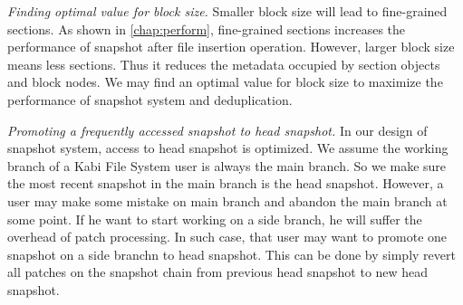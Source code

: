     \emph{Finding optimal value for block size.} Smaller block size will lead to fine-grained sections. As shown in \cref{chap:perform}, fine-grained sections increases the performance of snapshot after file insertion operation. However, larger block size means less sections. Thus it reduces the metadata occupied by section objects and block nodes. We may find an optimal value for block size to maximize the performance of snapshot system and deduplication.

    \emph{Promoting a frequently accessed snapshot to head snapshot.} In our design of snapshot system, access to head snapshot is optimized. We assume the working branch of a Kabi File System user is always the main branch. So we make sure the most recent snapshot in the main branch is the head snapshot. However, a user may make some mistake on main branch and abandon the main branch at some point. If he want to start working on a side branch, he will suffer the overhead of patch processing. In such case, that user may want to promote one snapshot on a side branchn to head snapshot. This can be done by simply revert all patches on the snapshot chain from previous head snapshot to new head snapshot.
